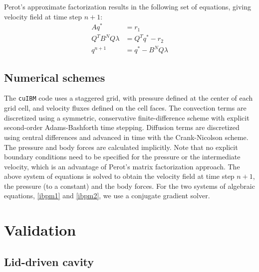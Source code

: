 \documentclass{tufte-handout}
\newcommand{\cuibm}{\Verb|cuIBM|\xspace}
\begin{document}
Perot's approximate factorization results in the following set of equations, giving velocity field at time step $n+1$:
\begin{subequations}
\begin{align}
	A q^{*} & =r_1 \label{ibpm1}\\
	Q^T B^N Q \lambda & = Q^T q^{*} - r_2 \label{ibpm2}\\
	q^{n+1} & = q^* - B^N Q \lambda \label{ibpm3}
\end{align}
\end{subequations}

\subsection{Numerical schemes}

The \cuibm code uses a staggered grid, with pressure defined at the center of each grid cell, and velocity fluxes defined on the cell faces.  The convection terms are discretized using a symmetric, conservative finite-difference scheme with explicit second-order Adams-Bashforth time stepping.  Diffusion terms are discretized using central differences and advanced in time with the Crank-Nicolson scheme. The pressure and body forces are calculated implicitly. Note that no explicit boundary conditions need to be specified for the pressure or the intermediate velocity, which is an advantage of Perot's matrix factorization approach. The above system of equations is solved to obtain the velocity field at time step $n+1$, the pressure (to a constant) and the body forces. %
For the two systems of algebraic equations, \eqref{ibpm1} and \eqref{ibpm2}, we use a conjugate gradient solver.

\section{Validation}\label{s:validation}

\subsection{Lid-driven cavity}
\end{document}
